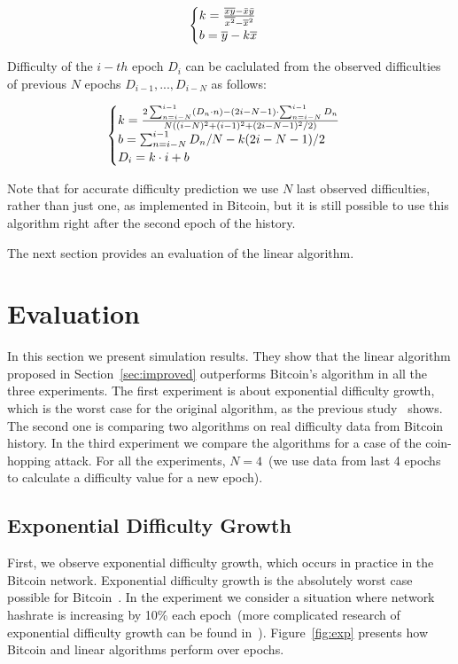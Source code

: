 \documentclass[]{llncs}
\newcommand*\mean[1]{\bar{#1}}
\newcommand*\widemean[1]{\overline{#1}}
\begin{document}
$$
  \begin{cases}
    k= {{\widemean{xy} - \mean{x} \mean{y}} \over {\widemean{x^2} - \widemean{x}^2}}  \\
    b= \widemean{y}-k\widemean{x}
  \end{cases}
$$

Difficulty of the $i-th$ epoch $D_i$ can be caclulated from the observed difficulties of previous $N$ epochs $D_{i-1},...,D_{i-N}$ as follows:

$$
  \begin{cases}
    k= {2\sum_{n=i-N}^{i-1} (D_n \cdot n) - (2i-N-1)\cdot \sum_{n=i-N}^{i-1} D_n \over N ( (i-N)^2 + (i-1)^2 + (2i-N-1)^2/2 )} \\
    b= \sum_{n=i-N}^{i-1} D_n / N-k (2i-N-1)/2 \\
    D_i= k \cdot i + b
  \end{cases}
$$

Note that for accurate difficulty prediction we use $N$ last observed difficulties, rather than just one, as implemented in Bitcoin, but it is still possible to use this algorithm right after the second epoch of the history.

The next section provides an evaluation of the linear algorithm.

\section{Evaluation}
\label{sec:sim}

In this section we present simulation results. They show that the linear algorithm proposed in Section~\ref{sec:improved} outperforms Bitcoin's algorithm in all the three experiments. The first experiment is about exponential difficulty growth, which is the worst case for the original algorithm, as the previous study~\cite{kraft2015difficulty} shows. The second one is comparing two algorithms on real difficulty data from Bitcoin history. In the third experiment we compare the algorithms for a case of the coin-hopping attack. For all the experiments, $N=4$~(we use data from last 4 epochs to calculate a difficulty value for a new epoch).  

\subsection{Exponential Difficulty Growth}
\label{sec:experiment}
First, we observe exponential difficulty growth, which occurs in practice in the Bitcoin network. Exponential difficulty growth is the absolutely worst case possible for Bitcoin~\cite{kraft2015difficulty}.
In the experiment we consider a situation where network hashrate is increasing by 10\% each epoch~(more complicated research of exponential difficulty growth can be found in~\cite{kraft2015difficulty}).
Figure~\ref{fig:exp} presents how Bitcoin and linear algorithms perform over epochs.
\end{document}
